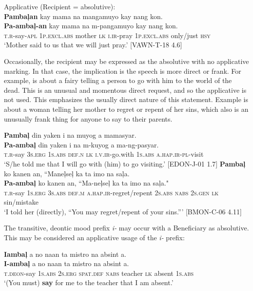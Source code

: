 \ea
Applicative (Recipient = absolutive): \\
\textbf{Pambaļan}  kay  mama  na  mangamuyo  kay  nang kon.\\\smallskip
\gll \textbf{Pa-ambaļ-an}  kay  mama  na  m-pangamuyo  kay  nang kon.\\
\textsc{t.r}-say-\textsc{apl}  1\textsc{p.excl.abs}  mother  \textsc{lk}  \textsc{i.ir}-pray  1\textsc{p.excl.abs}  only/just \textsc{hsy} \\
\glt ‘Mother said to us that we will just pray.’ [VAWN-T-18 4.6]
\z

Occasionally, the recipient may be expressed as the absolutive with no applicative marking. In that case, the implication is the speech is more direct or frank. For example,  is about a fairy telling a person to go with him to the world of the dead. This is an unusual and momentous direct request, and so the applicative is not used. This emphasizes the usually direct nature of this statement. Example  is about a woman telling her mother to regret or repent of her sins, which also is an unusually frank thing for anyone to say to their parents.

\ea
\label{bkm:Ref402322426}
\textbf{Pambaļ}  din  yaken  i  na  muyog  a  mamasyar. \\\smallskip
\gll \textbf{Pa-ambaļ}  din  yaken  i  na  m-kuyog  a  ma-ng-pasyar. \\
\textsc{t.r}-say  3\textsc{s.erg}  1\textsc{s.abs}  \textsc{def.n}  \textsc{lk}  \textsc{i.v.ir}-go.with  1\textsc{s.abs}  \textsc{a.hap.ir-pl}-visit \\
\glt ‘S/he told me that I will go with (him) to go visiting.’ [EDON-J-01 1.7]
\z
\ea
\label{bkm:Ref122516350}
\textbf{Pambaļ}  ko  kanen  an,  “Maneļseļ  ka   ta  imo  na  saļa.\\\smallskip
\gll \textbf{Pa-ambaļ}  ko  kanen  an,  “Ma-neļseļ  ka   ta  imo  na  saļa."\\
\textsc{t.r}-say  1\textsc{s.erg}  3\textsc{s.abs}  \textsc{def.m}  \textsc{a.hap.ir}-regret/repent  2\textsc{s.abs} \textsc{nabs}  2\textsc{s.gen}  \textsc{lk}  sin/mistake \\
\glt ‘I told her (directly), “You may regret/repent of your sins.”' [BMON-C-06 4.11]
\z

The transitive, deontic mood prefix \textit{i-} may occur with a Beneficiary as absolutive. This may be considered an applicative usage of the \textit{i-} prefix:

\ea
\textbf{Iambaļ}  a  no  naan  ta  mistro  na  absint  a. \\\smallskip
\gll \textbf{I-ambaļ}  a  no  naan  ta  mistro  na  absint  a. \\
\textsc{t.deon}-say  1\textsc{s.abs}  2\textsc{s.erg}  \textsc{spat.def}  \textsc{nabs}  teacher  \textsc{lk}  absent  1\textsc{s.abs} \\
\glt ‘(You must) \textbf{say} for me to the teacher that I am absent.’
\z

